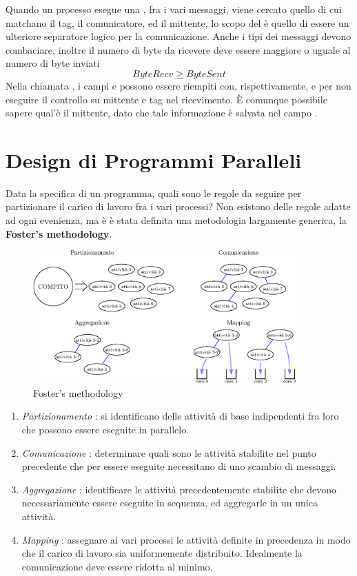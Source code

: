 \documentclass[10pt, letterpaper]{report}
\begin{document}
Quando un processo esegue una , fra i vari messaggi, viene cercato quello di cui matchano il tag, il 
comunicatore, ed il mittente, lo scopo del  è quello di essere un ulteriore separatore logico per 
la comunicazione. Anche i tipi dei messaggi devono combaciare, inoltre il numero di byte da ricevere deve essere 
maggiore o uguale al numero di byte inviati 
$$ ByteRecv\ge ByteSent$$
Nella chiamata , i campi  e  possono essere riempiti con, rispettivamente,
 e  per non eseguire il controllo su mittente e tag nel ricevimento. 
È comunque possibile sapere qual'è il mittente, dato che tale informazione è salvata nel campo .
\flowerLine 
\section{Design di Programmi Paralleli}
Data la specifica di un programma, quali sono le regole da seguire per partizionare il carico di lavoro fra i vari 
processi? Non esistono delle regole adatte ad ogni evenienza, ma è è stata definita una metodologia largamente generica, 
la \textbf{Foster's methodology}.
\begin{figure}[h!]
    \centering
    \includegraphics[width=0.9\textwidth]{images/foster.eps}
    \caption{Foster's methodology}
    \label{fig:foster}
\end{figure}
\begin{enumerate}
    \item \textit{Partizionamento} : si identificano delle attività di base indipendenti fra loro che possono essere
    eseguite in parallelo.
    \item \textit{Comunicazione} : determinare quali sono le attività stabilite nel punto precedente che per essere 
    eseguite necessitano di uno scambio di messaggi. 
    \item \textit{Aggregazione} : identificare le attività precedentemente stabilite che devono necessariamente essere 
    eseguite in sequenza, ed aggregarle in un unica attività.
    \item \textit{Mapping} : assegnare ai vari processi le attività definite in precedenza in modo che il carico di 
    lavoro sia uniformemente distribuito. Idealmente la comunicazione deve essere ridotta al minimo.
\end{enumerate}
\end{document}
